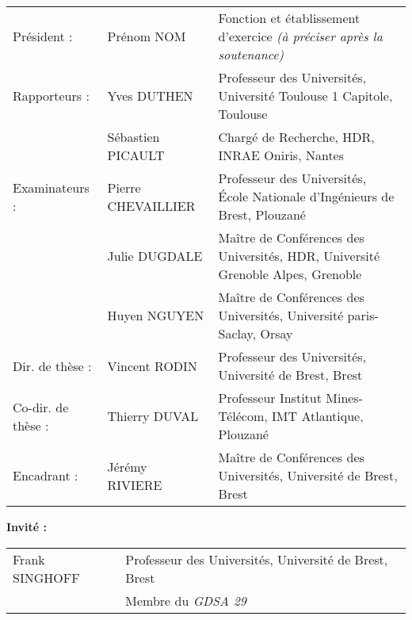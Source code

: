 {\begin{tabular}{@{}lll}
Pr\'{e}sident :        & Pr\'{e}nom NOM & Fonction et \'{e}tablissement d'exercice \textit{(à préciser après la soutenance)} \\
Rapporteurs :          & Yves DUTHEN & Professeur des Universités, Université Toulouse 1 Capitole, Toulouse \\
                       & Sébastien PICAULT & Chargé de Recherche, HDR, INRAE Oniris, Nantes\\
Examinateurs :         & Pierre CHEVAILLIER & Professeur des Universités, École Nationale d'Ingénieurs de Brest, Plouzané \\
                       & Julie DUGDALE & Maître de Conférences des Universités, HDR, Université Grenoble Alpes, Grenoble\\
                       & Huyen NGUYEN & Maître de Conférences des Universités, Université paris-Saclay, Orsay \\
Dir. de th\`{e}se :    & Vincent RODIN & Professeur des Universités, Université de Brest, Brest \\
Co-dir. de th\`{e}se : & Thierry DUVAL & Professeur Institut Mines-Télécom, IMT Atlantique, Plouzané \\
Encadrant : & Jérémy RIVIERE & Maître de Conférences des Universités, Université de Brest, Brest \\
\end{tabular}

\vspace{\baselineskip}
{\normalsize \textbf{Invit\'{e} :}}\\ \newline
\footnotesize
\begin{tabular}{@{}ll}
Frank SINGHOFF & Professeur des Universités, Université de Brest, Brest\\
 & Membre du \textit{GDSA 29}
\end{tabular}

\vspace{2.0cm}
}


\maketitle

